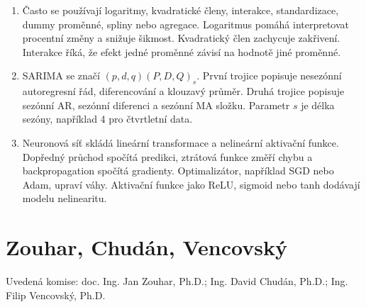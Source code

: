 \documentclass[12pt,a4paper]{article}
\begin{document}
\begin{enumerate}
  \item {}

  Často se používají logaritmy, kvadratické členy, interakce, standardizace, dummy proměnné, spliny
  nebo agregace. Logaritmus pomáhá interpretovat procentní změny a snižuje šikmost. Kvadratický člen
  zachycuje zakřivení. Interakce říká, že efekt jedné proměnné závisí na hodnotě jiné proměnné.

  \item {}

  SARIMA se značí \((p,d,q)(P,D,Q)_s\). První trojice popisuje nesezónní autoregresní řád, diferencování
  a klouzavý průměr. Druhá trojice popisuje sezónní AR, sezónní diferenci a sezónní MA složku.
  Parametr \(s\) je délka sezóny, například 4 pro čtvrtletní data.

  \item {}

  Neuronová síť skládá lineární transformace a nelineární aktivační funkce. Dopředný průchod spočítá
  predikci, ztrátová funkce změří chybu a backpropagation spočítá gradienty. Optimalizátor, například
  SGD nebo Adam, upraví váhy. Aktivační funkce jako ReLU, sigmoid nebo tanh dodávají modelu nelinearitu.
\end{enumerate}

\section{Zouhar, Chudán, Vencovský}
Uvedená komise: doc. Ing. Jan Zouhar, Ph.D.; Ing. David Chudán, Ph.D.; Ing. Filip Vencovský, Ph.D.
\end{document}
